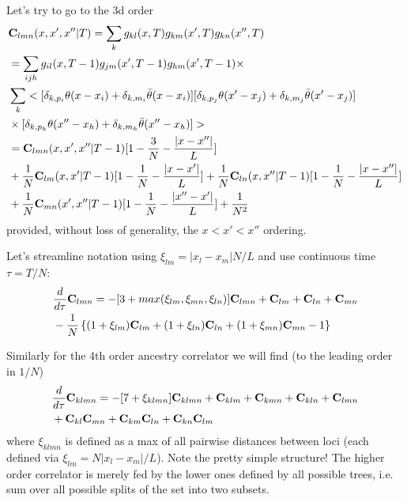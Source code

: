 \documentclass{article}
\begin{document}
Let's try to go to the 3d order
\begin{eqnarray}
&{\bf C}_{lmn}(x,x',x''|T)= \sum_{k} g_{kl}(x,T) g_{km}(x',T)g_{kn}(x'',T) \\
&= \sum_{ijh} g_{il}(x,T-1) g_{jm}(x',T-1) g_{hm}(x',T-1) \times \\
&\sum_k <[\delta_{k,p_i}\theta(x-x_i)+\delta_{k,m_i}{\bar \theta}(x-x_i)][\delta_{k,p_j}\theta(x'-x_j)+\delta_{k,m_j}{\bar \theta}(x'-x_j)]\\
&\times [\delta_{k,p_h}\theta(x''-x_h)+\delta_{k,m_h}{\bar \theta}(x''-x_h)]>\\
&= {\bf C}_{lmn}(x,x',x''|T-1) [1-{3 \over N}-{|x-x''| \over L}]\\
&+{1 \over N}{\bf C}_{lm}(x,x'|T-1) [1-{1 \over N}-{|x-x'| \over L}]+{1 \over N}{\bf C}_{ln}(x,x''|T-1) [1-{1 \over N}-{|x-x''| \over L}]\\
&+{1 \over N}{\bf C}_{mn}(x',x''|T-1) [1-{1 \over N}-{|x''-x'| \over L}]+{1 \over N^2}
\end{eqnarray}
provided, without loss of generality, the $x<x'<x''$ ordering.

Let's streamline notation using $\xi_{lm}=|x_l - x_m |N/L$ and use
 continuous time $\tau =T/N$:
\begin{eqnarray}
&{ d \over d\tau} {\bf C}_{lmn}= 
 -[3+max(\xi_{lm},\xi_{mn},\xi_{ln})]{\bf C}_{lmn}+{\bf C}_{lm} 
+{\bf C}_{ln} +{\bf C}_{mn}\\
 &-{1 \over N} \left \{ (1+\xi_{lm} ){\bf C}_{lm} 
+(1+\xi_{ln}){\bf C}_{ln} +(1+\xi_{mn}){\bf C}_{mn} -1 \right \}
\end{eqnarray}

Similarly for the 4th order ancestry correlator we will find (to the leading order in $1/N$)
\begin{eqnarray}
&{ d \over d\tau} {\bf C}_{klmn}= 
 -[7+\xi_{klmn}]{\bf C}_{klmn}+{\bf C}_{klm} +{\bf C}_{kmn}
+{\bf C}_{kln} +{\bf C}_{lmn}\\
&+{\bf C}_{kl}{\bf C}_{mn} +{\bf C}_{km}{\bf C}_{ln} +{\bf C}_{kn}{\bf C}_{lm} 
\end{eqnarray}
where $\xi_{klmn}$ is defined as a max of all pairwise distances between loci (each defined via $\xi_{lm}=N|x_l-x_m|/L$). Note the pretty simple structure! The higher order correlator is merely fed by the lower ones defined by all possible trees, i.e. sum over all possible splits  of the set into two subsets.
\end{document}
